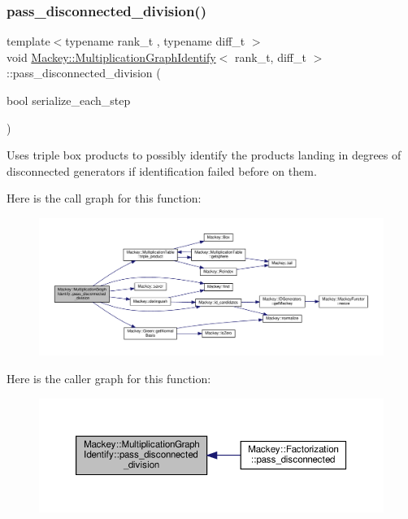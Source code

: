 \subsubsection{\texorpdfstring{pass\+\_\+disconnected\+\_\+division()}{pass\_disconnected\_division()}}
{\footnotesize\ttfamily template$<$typename rank\+\_\+t , typename diff\+\_\+t $>$ \\
void \hyperlink{classMackey_1_1MultiplicationGraphIdentify}{Mackey\+::\+Multiplication\+Graph\+Identify}$<$ rank\+\_\+t, diff\+\_\+t $>$\+::pass\+\_\+disconnected\+\_\+division (\begin{DoxyParamCaption}\item[{bool}]{serialize\+\_\+each\+\_\+step }\end{DoxyParamCaption})\hspace{0.3cm}{\ttfamily [protected]}}



Uses triple box products to possibly identify the products landing in degrees of disconnected generators if identification failed before on them. 

Here is the call graph for this function\+:\nopagebreak
\begin{figure}[H]
\begin{center}
\leavevmode
\includegraphics[width=350pt]{classMackey_1_1MultiplicationGraphIdentify_a9791070d75d845d15f1763c03db0b5ce_cgraph}
\end{center}
\end{figure}
Here is the caller graph for this function\+:\nopagebreak
\begin{figure}[H]
\begin{center}
\leavevmode
\includegraphics[width=350pt]{classMackey_1_1MultiplicationGraphIdentify_a9791070d75d845d15f1763c03db0b5ce_icgraph}
\end{center}
\end{figure}
\mbox{\label{classMackey_1_1MultiplicationGraphIdentify_a110991be3ba595dbf401ef4a769e4dec}} 
